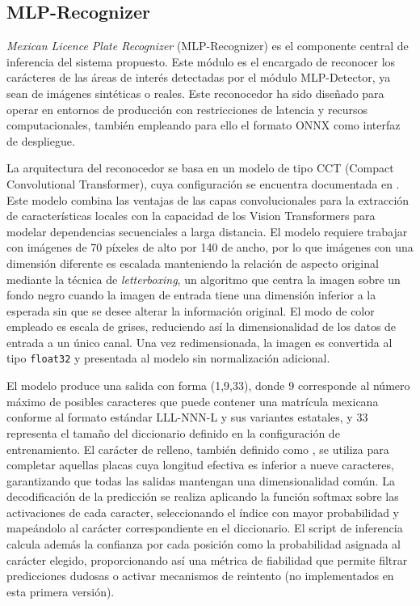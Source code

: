\subsection*{MLP-Recognizer}
\textit{Mexican Licence Plate Recognizer} (MLP-Recognizer) es el componente central de inferencia del sistema propuesto. Este módulo es el encargado de reconocer los carácteres de las áreas de interés detectadas por el módulo MLP-Detector, ya sean de imágenes sintéticas o reales. Este reconocedor ha sido diseñado para operar en entornos de producción con restricciones de latencia y recursos computacionales, también empleando para ello el formato ONNX como interfaz de despliegue.

La arquitectura del reconocedor se basa en un modelo de tipo CCT (Compact Convolutional Transformer), cuya configuración se encuentra documentada en \cite{fastplateOCR}. Este modelo combina las ventajas de las capas convolucionales para la extracción de características locales con la capacidad de los Vision Transformers para modelar dependencias secuenciales a larga distancia. El modelo requiere trabajar con imágenes de 70 píxeles de alto por 140 de ancho, por lo que imágenes con una dimensión diferente es escalada manteniendo la relación de aspecto original mediante la técnica de \textit{letterboxing}, un algoritmo que centra la imagen sobre un fondo negro cuando la imagen de entrada tiene una dimensión inferior a la esperada sin que se desee alterar la información original. El modo de color empleado es escala de grises, reduciendo así la dimensionalidad de los datos de entrada a un único canal. Una vez redimensionada, la imagen es convertida al tipo \texttt{float32} y presentada al modelo sin normalización adicional.

El modelo produce una salida con forma (1,9,33), donde 9 corresponde al número máximo de posibles caracteres que puede contener una matrícula mexicana conforme al formato estándar LLL-NNN-L y sus variantes estatales, y 33 representa el tamaño del diccionario definido en la configuración de entrenamiento. El carácter de relleno, también definido como \quotes{-}, se utiliza para completar aquellas placas cuya longitud efectiva es inferior a nueve caracteres, garantizando que todas las salidas mantengan una dimensionalidad común. La decodificación de la predicción se realiza aplicando la función softmax sobre las activaciones de cada caracter, seleccionando el índice con mayor probabilidad y mapeándolo al carácter correspondiente en el diccionario. El script de inferencia calcula además la confianza por cada posición como la probabilidad asignada al carácter elegido, proporcionando así una métrica de fiabilidad que permite filtrar predicciones dudosas o activar mecanismos de reintento (no implementados en esta primera versión).

